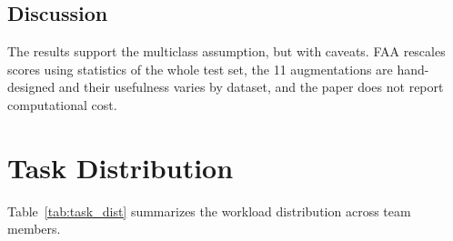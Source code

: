 \documentclass[sigconf,nonacm]{acmart}
\begin{document}
\subsection{Discussion}
The results support the multiclass assumption, but with caveats. FAA rescales scores using statistics of the whole test set, the 11 augmentations are hand-designed and their usefulness varies by dataset, and the paper does not report computational cost.

\section{Task Distribution}
Table~\ref{tab:task_dist} summarizes the workload distribution across team members.

\par\vspace{6pt plus 3pt minus 2pt}\noindent
\begin{minipage}[b]{\columnwidth}
\setlength{\abovecaptionskip}{0pt}%
\setlength{\belowcaptionskip}{5pt}%
%
\label{tab:task_dist}%
\centering
\footnotesize
\setlength{\tabcolsep}{4.5pt}%
\end{minipage}\par
\end{document}
